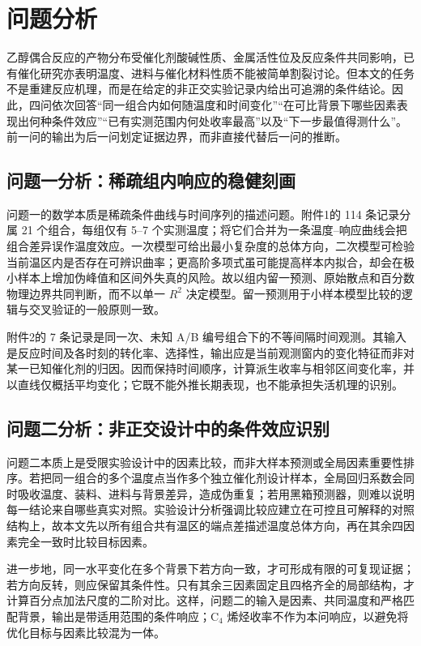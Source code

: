 \section{问题分析}

乙醇偶合反应的产物分布受催化剂酸碱性质、金属活性位及反应条件共同影响，已有催化研究亦表明温度、进料与催化材料性质不能被简单割裂讨论\cite{pomalaza2016,hanspal2017,lovon2017,cimino2018,fihri2017}。但本文的任务不是重建反应机理，而是在给定的非正交实验记录内给出可追溯的条件结论。因此，四问依次回答“同一组合内如何随温度和时间变化”“在可比背景下哪些因素表现出何种条件效应”“已有实测范围内何处收率最高”以及“下一步最值得测什么”。前一问的输出为后一问划定证据边界，而非直接代替后一问的推断。

\subsection{问题一分析：稀疏组内响应的稳健刻画}

问题一的数学本质是稀疏条件曲线与时间序列的描述问题。附件1的 114 条记录分属 21 个组合，每组仅有 5--7 个实测温度；将它们合并为一条温度--响应曲线会把组合差异误作温度效应。一次模型可给出最小复杂度的总体方向，二次模型可检验当前温区内是否存在可辨识曲率；更高阶多项式虽可能提高样本内拟合，却会在极小样本上增加伪峰值和区间外失真的风险。故以组内留一预测、原始散点和百分数物理边界共同判断，而不以单一 $R^2$ 决定模型。留一预测用于小样本模型比较的逻辑与交叉验证的一般原则一致\cite{stone1974,arlot2010}。

附件2的 7 条记录是同一次、未知 A/B 编号组合下的不等间隔时间观测。其输入是反应时间及各时刻的转化率、选择性，输出应是当前观测窗内的变化特征而非对某一已知催化剂的归因。因而保持时间顺序，计算派生收率与相邻区间变化率，并以直线仅概括平均变化；它既不能外推长期表现，也不能承担失活机理的识别。

\subsection{问题二分析：非正交设计中的条件效应识别}

问题二本质上是受限实验设计中的因素比较，而非大样本预测或全局因素重要性排序。若把同一组合的多个温度点当作多个独立催化剂设计样本，全局回归系数会同时吸收温度、装料、进料与背景差异，造成伪重复；若用黑箱预测器，则难以说明每一结论来自哪些真实对照。实验设计分析强调比较应建立在可控且可解释的对照结构上\cite{montgomery2017,box2005}，故本文先以所有组合共有温区的端点差描述温度总体方向，再在其余四因素完全一致时比较目标因素。

进一步地，同一水平变化在多个背景下若方向一致，才可形成有限的可复现证据；若方向反转，则应保留其条件性。只有其余三因素固定且四格齐全的局部结构，才计算百分点加法尺度的二阶对比。这样，问题二的输入是因素、共同温度和严格匹配背景，输出是带适用范围的条件响应；$\mathrm{C}_4$ 烯烃收率不作为本问响应，以避免将优化目标与因素比较混为一体。

